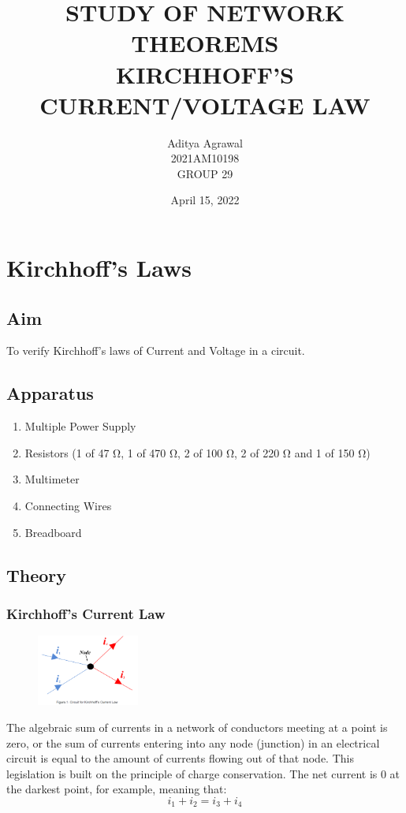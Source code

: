 \documentclass{article}
\title{STUDY OF NETWORK THEOREMS\\KIRCHHOFF'S CURRENT/VOLTAGE LAW}
\author{Aditya Agrawal\\2021AM10198\\GROUP 29}
\date{April 15, 2022}
\begin{document}
\maketitle
\tableofcontents
\newpage
\section{Kirchhoff's Laws}
\subsection{Aim}
To verify Kirchhoff's laws of Current and Voltage in a circuit.

\subsection{Apparatus}
\begin{enumerate}
    \item Multiple Power Supply
    \item Resistors (1 of 47 Ω, 1 of 470 Ω, 2 of 100 Ω, 2 of    220 Ω and 1 of 150 Ω)
    \item Multimeter
    \item Connecting Wires
    \item Breadboard
\end{enumerate}

\subsection{Theory}
\subsubsection{Kirchhoff's Current Law}
\begin{figure}
\includegraphics[width=0.3\textwidth]{pic1.png}
\end{figure}
The algebraic sum of currents in a network of conductors meeting at a point is zero, or the sum of currents entering into any node (junction) in an electrical circuit is equal to the amount of currents flowing out of that node. This legislation is built on the principle of charge conservation. The net current is 0 at the darkest point, for example, meaning that:
\begin{equation}
    i_{1} + i_{2} = i_{3} + i_{4}
\end{equation}
\end{document}
